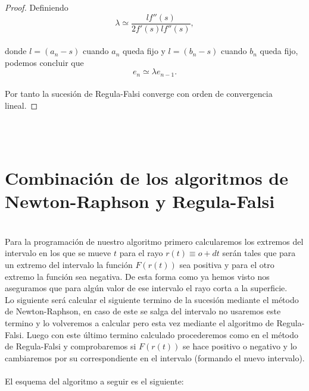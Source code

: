 \begin{proof}
	Definiendo
	${ }$\\
	\[
		\lambda \simeq \frac{l f''(s)}{2 f'(s) l f''(s)},
	\]
	${ }$\\
	donde $l = (a_n - s)$ cuando $a_n$ queda fijo y $l = (b_n - s)$ cuando $b_n$ queda fijo, podemos concluir que
	${ }$\\
	\[
		e_n \simeq \lambda e_{n-1}.
	\]
	${ }$\\
	
	Por tanto la sucesión de Regula-Falsi converge con orden de convergencia lineal.
\end{proof}
${ }$\\


${ }$\\
\section{Combinación de los algoritmos de Newton-Raphson y Regula-Falsi}
${ }$\\

Para la programación de nuestro algoritmo primero calcularemos los extremos del intervalo en los que se mueve $t$ para el rayo $r(t) \equiv o + dt$ serán tales que para un extremo del intervalo la función $F(r(t))$ sea positiva y para el otro extremo la función sea negativa. De esta forma como ya hemos visto nos aseguramos que para algún valor de ese intervalo el rayo corta a la superficie.
${ }$\\

Lo siguiente será calcular el siguiente termino de la sucesión mediante el método de Newton-Raphson, en caso de este se salga del intervalo no usaremos este termino y lo volveremos a calcular pero esta vez mediante el algoritmo de Regula-Falsi. Luego con este último termino calculado procederemos como en el método de Regula-Falsi y comprobaremos si $F(r(t))$ se hace positivo o negativo y lo cambiaremos por su correspondiente en el intervalo (formando el nuevo intervalo).
${ }$\\

El esquema del algoritmo a seguir es el siguiente:

